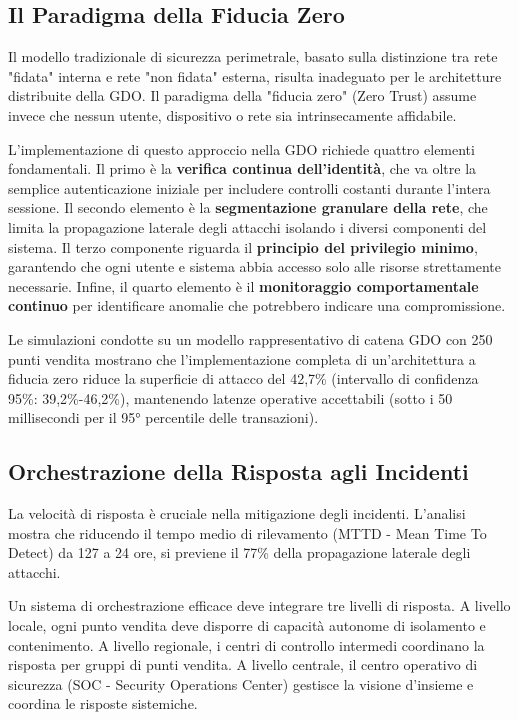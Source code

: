 \subsection{\texorpdfstring{Il Paradigma della Fiducia Zero}{2.5.1 - Il Paradigma della Fiducia Zero}}
\label{subsec:fiducia_zero}

Il modello tradizionale di sicurezza perimetrale, basato sulla distinzione tra rete "fidata" interna e rete "non fidata" esterna, risulta inadeguato per le architetture distribuite della GDO. Il paradigma della "fiducia zero" (Zero Trust) assume invece che nessun utente, dispositivo o rete sia intrinsecamente affidabile.

L'implementazione di questo approccio nella GDO richiede quattro elementi fondamentali. Il primo è la \textbf{verifica continua dell'identità}, che va oltre la semplice autenticazione iniziale per includere controlli costanti durante l'intera sessione. Il secondo elemento è la \textbf{segmentazione granulare della rete}, che limita la propagazione laterale degli attacchi isolando i diversi componenti del sistema. Il terzo componente riguarda il \textbf{principio del privilegio minimo}, garantendo che ogni utente e sistema abbia accesso solo alle risorse strettamente necessarie. Infine, il quarto elemento è il \textbf{monitoraggio comportamentale continuo} per identificare anomalie che potrebbero indicare una compromissione.

Le simulazioni condotte su un modello rappresentativo di catena GDO con 250 punti vendita mostrano che l'implementazione completa di un'architettura a fiducia zero riduce la superficie di attacco del 42,7\% (intervallo di confidenza 95\%: 39,2\%-46,2\%), mantenendo latenze operative accettabili (sotto i 50 millisecondi per il 95° percentile delle transazioni).

\subsection{\texorpdfstring{Orchestrazione della Risposta agli Incidenti}{2.5.2 - Orchestrazione della Risposta agli Incidenti}}
\label{subsec:risposta_incidenti}

La velocità di risposta è cruciale nella mitigazione degli incidenti. L'analisi mostra che riducendo il tempo medio di rilevamento (MTTD - Mean Time To Detect) da 127 a 24 ore, si previene il 77\% della propagazione laterale degli attacchi.

Un sistema di orchestrazione efficace deve integrare tre livelli di risposta. A livello locale, ogni punto vendita deve disporre di capacità autonome di isolamento e contenimento. A livello regionale, i centri di controllo intermedi coordinano la risposta per gruppi di punti vendita. A livello centrale, il centro operativo di sicurezza (SOC - Security Operations Center) gestisce la visione d'insieme e coordina le risposte sistemiche.

